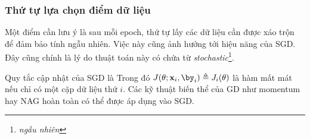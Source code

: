 \subsubsection{Thứ tự lựa chọn điểm dữ liệu} 
 
Một điểm cần lưu ý là sau mỗi epoch, thứ tự lấy các dữ liệu cần được xáo trộn để đảm bảo tính ngẫu nhiên.
Việc này cũng ảnh hưởng tới hiệu năng của SGD. Đây cũng chính là lý do thuật
toán này có chứa từ \textit{stochastic}\footnote{\textit{ngẫu nhiên}}.
 
Quy tắc cập nhật của SGD là
Trong đó $J(\theta; \mathbf{x}_i, \by_i) \triangleq J_i(\theta)$ là hàm
mất mát nếu chỉ có một cặp dữ liệu thứ $i$. Các kỹ thuật biến
thể của GD như momentum hay NAG hoàn toàn có thể được áp dụng vào SGD. 


 
 
 
 
 
 
 
 
